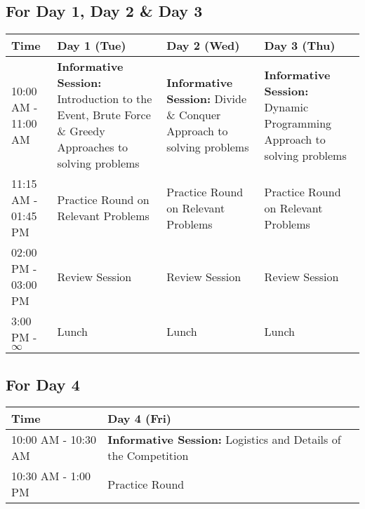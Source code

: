 \documentclass[12pt]{article}
\begin{document}
\subsection*{\centering For Day 1, Day 2 \& Day 3}
\begin{table}[H]
  \centering
  \begin{tabular}{|p{2.1cm}|p{4.3cm}|p{4.3cm}|p{4.3cm}|}
    \hline
    Time                & Day 1 (Tue)                                                                                                   & Day 2 (Wed)                                                                  & Day 3 (Thu)                                                                    \\
    \hline
    10:00 AM - 11:00 AM & \textbf{Informative Session:} Introduction to the Event, Brute Force \& Greedy Approaches to solving problems & \textbf{Informative Session:} Divide \& Conquer Approach to solving problems & \textbf{Informative Session:} Dynamic Programming Approach to solving problems \\
    \hline
    11:15 AM - 01:45 PM & Practice Round on Relevant Problems                                                                           & Practice Round on Relevant Problems                                          & Practice Round on Relevant Problems                                            \\
    \hline
    02:00 PM - 03:00 PM & Review Session                                                                                                & Review Session                                                               & Review Session                                                                 \\
    \hline
    3:00 PM - $\infty$  & Lunch                                                                                                         & Lunch                                                                        & Lunch                                                                          \\
    \hline
  \end{tabular}
\end{table}

\subsection*{\centering For Day 4}
\begin{table}[H]
  \centering
  \begin{tabular}{|p{2.1cm}|p{12.9cm}|}
    \hline
    Time                & Day 4 (Fri)                                                            \\
    \hline
    10:00 AM - 10:30 AM & \textbf{Informative Session:} Logistics and Details of the Competition \\
    \hline
    10:30 AM - 1:00 PM  & Practice Round                                                         \\
    \hline
  \end{tabular}
\end{table}
\end{document}
